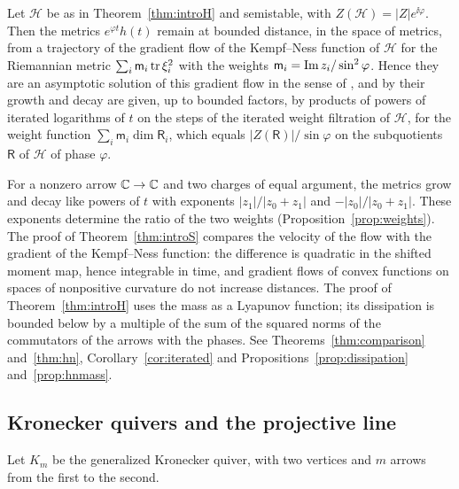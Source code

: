 \begin{theorem}\label{thm:introS}
Let $\mathcal H$ be as in Theorem~\ref{thm:introH} and semistable, with
$Z(\mathcal H)=|Z|e^{\ii\varphi}$. Then the metrics $e^{\varphi t}h(t)$ remain
at bounded distance, in the space of metrics, from a trajectory of the
gradient flow of the Kempf--Ness function of $\mathcal H$ for the
Riemannian metric $\sum_i\mathsf m_i\operatorname{tr}\xi_i^2$ with the weights
$\mathsf m_i=\operatorname{Im} z_i/\sin^2\varphi$. Hence they are an asymptotic solution of
this gradient flow in the sense of \cite{hkkp23}, and by
\cite[Corollary~5.10 and Theorem~5.11]{hkkp23} their growth and decay are
given, up to bounded factors, by products of powers of iterated logarithms
of $t$ on the steps of the iterated weight filtration of $\mathcal H$, for
the weight function $\sum_i\mathsf m_i\dim\mathsf R_i$, which equals
$|Z(\mathsf R)|/\sin\varphi$ on the subquotients $\mathsf R$ of $\mathcal H$
of phase $\varphi$.
\end{theorem}

For a nonzero arrow $\mathbb C\to\mathbb C$ and two charges of equal argument, the
metrics grow and decay like powers of $t$ with exponents $|z_1|/|z_0+z_1|$
and $-|z_0|/|z_0+z_1|$. These exponents determine the ratio of the two
weights (Proposition~\ref{prop:weights}). The proof of
Theorem~\ref{thm:introS} compares the velocity of the flow with the gradient
of the Kempf--Ness function: the difference is quadratic in the shifted
moment map, hence integrable in time, and gradient flows of convex
functions on spaces of nonpositive curvature do not increase distances. The
proof of Theorem~\ref{thm:introH} uses the mass as a Lyapunov function; its
dissipation is bounded below by a multiple of the sum of the squared norms
of the commutators of the arrows with the phases. See Theorems~\ref{thm:comparison} and~\ref{thm:hn},
Corollary~\ref{cor:iterated} and
Propositions~\ref{prop:dissipation} and~\ref{prop:hnmass}.

\subsection{Kronecker quivers and the projective line}
Let $K_m$ be the generalized Kronecker quiver, with two vertices and $m$
arrows from the first to the second.

